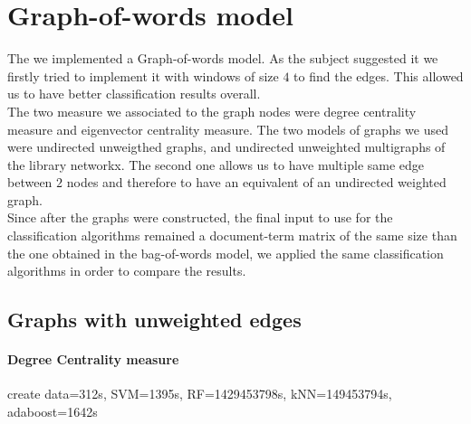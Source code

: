 \documentclass[11pt,a4paper]{article}
\begin{document}
\section{Graph-of-words model}
The we implemented a Graph-of-words model. As the subject suggested it we firstly tried to implement it with windows of size $4$ to find the edges. This allowed us to have better classification results overall. \\
The two measure we associated to the graph nodes were degree centrality measure and eigenvector centrality measure.
The two models of graphs we used were undirected unweigthed graphs, and undirected unweighted multigraphs of the library networkx. The second one allows us to have multiple same edge between $2$ nodes and therefore to have an equivalent of an undirected weighted graph.\\
Since after the graphs were constructed, the final input to use for the classification algorithms remained a document-term matrix of the same size than the one obtained in the bag-of-words model, we applied the same classification algorithms in order to compare the results.
\subsection{Graphs with unweighted edges}
\paragraph{Degree Centrality measure \newline}
create data=312s, SVM=1395s, RF=1429453798s, kNN=149453794s, adaboost=1642s
\end{document}
